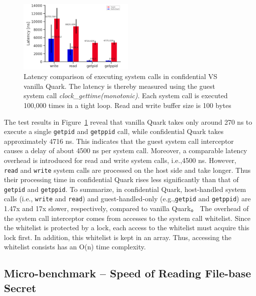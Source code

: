 \begin{figure}[!htb]
    \centering
    \includegraphics[width=0.5\textwidth]{images/ben_results_syscall_interceptor.PNG}
    \caption[Benchmark result of Syscall Interceptor]{Latency comparison of executing system calls in confidential VS vanilla Quark. The latency is thereby measured using the guest system call \emph{clock\_gettime(monotonic)}. 
        Each system call is executed 100,000  times in a tight loop. Read and write buffer size is 100 bytes}
    \label{fig:ben_results_syscall_interceptor}
\end{figure}

The test results in Figure~\ref{fig:ben_results_syscall_interceptor} reveal that vanilla Quark takes only around 270 ns to execute a single \texttt{getpid} and \texttt{getppid} call, while confidential Quark takes approximately 4716 ns. This indicates that the guest system call interceptor causes a delay of about 4500 ns per system call. Moreover, a 
comparable latency overhead is introduced for read and write system calls, i.e.,4500 ns. However, \texttt{read} and \texttt{write} system calls are processed on the host side and take longer. Thus their processing time in confidential Quark rises less significantly than that of \texttt{getpid} and \texttt{getppid}. To summarize, in 
confidential Quark, host-handled system calls (i.e., \texttt{write} and \texttt{read}) and guest-handled-only (e.g.,\texttt{getpid} and \texttt{getppid}) are 1.47x and 17x slower, respectively, compared to vanilla Quark。 The overhead of the system call interceptor comes from accesses to the system call whitelist. Since the whitelist is 
protected by a lock, each access to the whitelist must acquire this lock first. In addition, this whitelist is kept in an array. Thus, accessing the whitelist consists has an O(n) time complexity.

\subsection{Micro-benchmark – Speed of Reading File-base Secret}\label{bench_reading_file_secret}


